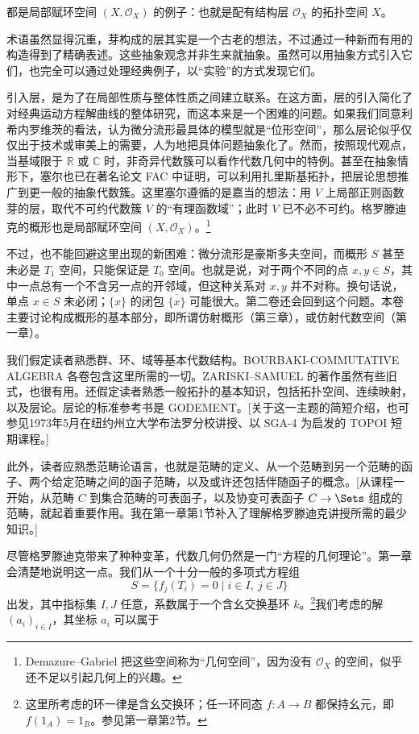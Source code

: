 都是局部赋环空间 $(X,\mathcal O_X)$ 的例子：也就是配有结构层 $\mathcal O_X$ 的拓扑空间 $X$。

术语虽然显得沉重，芽构成的层其实是一个古老的想法，不过通过一种新而有用的构造得到了精确表述。这些抽象观念并非生来就抽象。虽然可以用抽象方式引入它们，也完全可以通过处理经典例子，以“实验”的方式发现它们。

引入层，是为了在局部性质与整体性质之间建立联系。在这方面，层的引入简化了对经典运动方程解曲线的整体研究，而这本来是一个困难的问题。如果我们同意利希内罗维茨的看法，认为微分流形最具体的模型就是“位形空间”，那么层论似乎仅仅出于技术或审美上的需要，人为地把具体问题抽象化了。然而，按照现代观点，当基域限于 $\mathbb R$ 或 $\mathbb C$ 时，非奇异代数簇可以看作代数几何中的特例。甚至在抽象情形下，塞尔也已在著名论文 FAC 中证明，可以利用扎里斯基拓扑，把层论思想推广到更一般的抽象代数簇。这里塞尔遵循的是嘉当的想法：用 $V$ 上局部正则函数芽的层，取代不可约代数簇 $V$ 的“有理函数域”；此时 $V$ 已不必不可约。格罗滕迪克的概形也是局部赋环空间 $(X,\mathcal O_X)$。\footnote{Demazure--Gabriel 把这些空间称为“几何空间”，因为没有 $\mathcal O_X$ 的空间，似乎还不足以引起几何上的兴趣。}

不过，也不能回避这里出现的新困难：微分流形是豪斯多夫空间，而概形 $S$ 甚至未必是 $T_1$ 空间，只能保证是 $T_0$ 空间。也就是说，对于两个不同的点 $x,y\in S$，其中一点总有一个不含另一点的开邻域，但这种关系对 $x,y$ 并不对称。换句话说，单点 $x\in S$ 未必闭；$\{x\}$ 的闭包 $\overline{\{x\}}$ 可能很大。第二卷还会回到这个问题。本卷主要讨论构成概形的基本部分，即所谓仿射概形（第三章），或仿射代数空间（第一章）。

我们假定读者熟悉群、环、域等基本代数结构。BOURBAKI-COMMUTATIVE ALGEBRA 各卷包含这里所需的一切。ZARISKI--SAMUEL 的著作虽然有些旧式，也很有用。还假定读者熟悉一般拓扑的基本知识，包括拓扑空间、连续映射，以及层论。层论的标准参考书是 GODEMENT。[关于这一主题的简短介绍，也可参见1973年5月在纽约州立大学布法罗分校讲授、以 SGA-4 为启发的 TOPOI 短期课程。]

此外，读者应熟悉范畴论语言，也就是范畴的定义、从一个范畴到另一个范畴的函子、两个给定范畴之间的函子范畴，以及或许还包括伴随函子的概念。[从课程一开始，从范畴 $C$ 到集合范畴的可表函子，以及协变可表函子 $C\to\Sets$ 组成的范畴，就起着重要作用。我在第一章第1节补入了理解格罗滕迪克讲授所需的最少知识。]

尽管格罗滕迪克带来了种种变革，代数几何仍然是一门“方程的几何理论”。第一章会清楚地说明这一点。我们从一个十分一般的多项式方程组
\[
S=\{f_j(T_i)=0\mid i\in I,\ j\in J\}
\]
出发，其中指标集 $I,J$ 任意，系数属于一个含幺交换基环 $k$。\footnote{这里所考虑的环一律是含幺交换环；任一环同态 $f:A\to B$ 都保持幺元，即 $f(1_A)=1_B$。参见第一章第2节。}我们考虑的解 $(a_i)_{i\in I}$，其坐标 $a_i$ 可以属于

